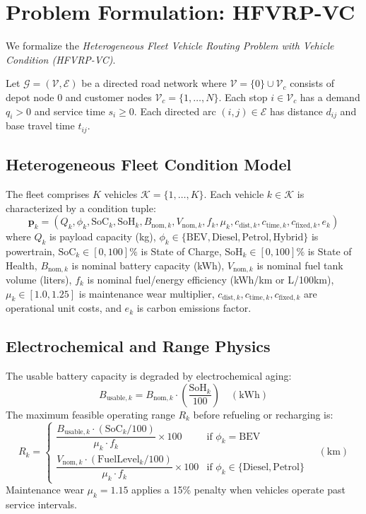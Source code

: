 \section{Problem Formulation: HFVRP-VC}
\label{sec:problem_formulation}
We formalize the \textit{Heterogeneous Fleet Vehicle Routing Problem with Vehicle Condition (HFVRP-VC)}. 

Let $\mathcal{G} = (\mathcal{V}, \mathcal{E})$ be a directed road network where $\mathcal{V} = \{0\} \cup \mathcal{V}_c$ consists of depot node $0$ and customer nodes $\mathcal{V}_c = \{1, \dots, N\}$. Each stop $i \in \mathcal{V}_c$ has a demand $q_i > 0$ and service time $s_i \ge 0$. Each directed arc $(i, j) \in \mathcal{E}$ has distance $d_{ij}$ and base travel time $t_{ij}$.

\subsection{Heterogeneous Fleet Condition Model}
The fleet comprises $K$ vehicles $\mathcal{K} = \{1, \dots, K\}$. Each vehicle $k \in \mathcal{K}$ is characterized by a condition tuple:
\begin{equation}
\mathbf{p}_k = (Q_k, \phi_k, \text{SoC}_k, \text{SoH}_k, B_{\text{nom}, k}, V_{\text{nom}, k}, f_k, \mu_k, c_{\text{dist}, k}, c_{\text{time}, k}, c_{\text{fixed}, k}, e_k)
\end{equation}
where $Q_k$ is payload capacity (kg), $\phi_k \in \{\text{BEV}, \text{Diesel}, \text{Petrol}, \text{Hybrid}\}$ is powertrain, $\text{SoC}_k \in [0, 100]\%$ is State of Charge, $\text{SoH}_k \in [0, 100]\%$ is State of Health, $B_{\text{nom}, k}$ is nominal battery capacity (kWh), $V_{\text{nom}, k}$ is nominal fuel tank volume (liters), $f_k$ is nominal fuel/energy efficiency (kWh/km or L/100km), $\mu_k \in [1.0, 1.25]$ is maintenance wear multiplier, $c_{\text{dist}, k}, c_{\text{time}, k}, c_{\text{fixed}, k}$ are operational unit costs, and $e_k$ is carbon emissions factor.

\subsection{Electrochemical and Range Physics}
The usable battery capacity is degraded by electrochemical aging:
\begin{equation}
B_{\text{usable}, k} = B_{\text{nom}, k} \cdot \left(\frac{\text{SoH}_k}{100}\right) \quad (\text{kWh})
\end{equation}
The maximum feasible operating range $R_k$ before refueling or recharging is:
\begin{equation}
R_k = \begin{cases} 
\dfrac{B_{\text{usable}, k} \cdot (\text{SoC}_k / 100)}{\mu_k \cdot f_k} \times 100 & \text{if } \phi_k = \text{BEV} \\[2ex]
\dfrac{V_{\text{nom}, k} \cdot (\text{FuelLevel}_k / 100)}{\mu_k \cdot f_k} \times 100 & \text{if } \phi_k \in \{\text{Diesel}, \text{Petrol}\}
\end{cases} \quad (\text{km})
\end{equation}
Maintenance wear $\mu_k = 1.15$ applies a 15\% penalty when vehicles operate past service intervals.
